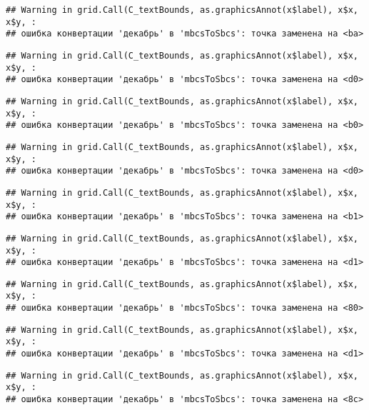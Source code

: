 \documentclass[
]{article}
\begin{document}
\begin{verbatim}
## Warning in grid.Call(C_textBounds, as.graphicsAnnot(x$label), x$x, x$y, :
## ошибка конвертации 'декабрь' в 'mbcsToSbcs': точка заменена на <ba>
\end{verbatim}

\begin{verbatim}
## Warning in grid.Call(C_textBounds, as.graphicsAnnot(x$label), x$x, x$y, :
## ошибка конвертации 'декабрь' в 'mbcsToSbcs': точка заменена на <d0>
\end{verbatim}

\begin{verbatim}
## Warning in grid.Call(C_textBounds, as.graphicsAnnot(x$label), x$x, x$y, :
## ошибка конвертации 'декабрь' в 'mbcsToSbcs': точка заменена на <b0>
\end{verbatim}

\begin{verbatim}
## Warning in grid.Call(C_textBounds, as.graphicsAnnot(x$label), x$x, x$y, :
## ошибка конвертации 'декабрь' в 'mbcsToSbcs': точка заменена на <d0>
\end{verbatim}

\begin{verbatim}
## Warning in grid.Call(C_textBounds, as.graphicsAnnot(x$label), x$x, x$y, :
## ошибка конвертации 'декабрь' в 'mbcsToSbcs': точка заменена на <b1>
\end{verbatim}

\begin{verbatim}
## Warning in grid.Call(C_textBounds, as.graphicsAnnot(x$label), x$x, x$y, :
## ошибка конвертации 'декабрь' в 'mbcsToSbcs': точка заменена на <d1>
\end{verbatim}

\begin{verbatim}
## Warning in grid.Call(C_textBounds, as.graphicsAnnot(x$label), x$x, x$y, :
## ошибка конвертации 'декабрь' в 'mbcsToSbcs': точка заменена на <80>
\end{verbatim}

\begin{verbatim}
## Warning in grid.Call(C_textBounds, as.graphicsAnnot(x$label), x$x, x$y, :
## ошибка конвертации 'декабрь' в 'mbcsToSbcs': точка заменена на <d1>
\end{verbatim}

\begin{verbatim}
## Warning in grid.Call(C_textBounds, as.graphicsAnnot(x$label), x$x, x$y, :
## ошибка конвертации 'декабрь' в 'mbcsToSbcs': точка заменена на <8c>
\end{verbatim}
\end{document}
